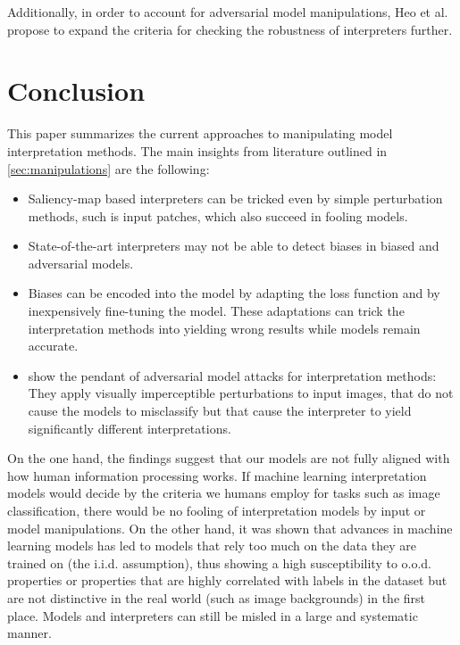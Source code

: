 \documentclass[sigconf]{acmart}
\begin{document}
Additionally, in order to account for adversarial model manipulations, Heo et al. \cite{fooling_nn_interpreters} propose to expand the criteria for checking the robustness of interpreters further.


% 
\section{Conclusion}
\label{sec:discussion}

This paper summarizes the current approaches to manipulating model interpretation methods. 
The main insights from literature outlined in \autoref{sec:manipulations} are the following: 
\begin{itemize}
    \item Saliency-map based interpreters can be tricked even by simple perturbation methods, such is input patches, which also succeed in fooling models. \cite{subramanya2019fooling}
    \item State-of-the-art interpreters may not be able to detect biases in biased and adversarial models.\cite{dimanov2020you, advlime_aies20}
    \item Biases can be encoded into the model by adapting the loss function and by inexpensively fine-tuning the model. These adaptations can trick the interpretation methods into yielding wrong results while models remain accurate. \cite{fooling_nn_interpreters}
    \item \cite{dombrowski2019explanations} show the pendant of adversarial model  attacks for interpretation methods: They apply visually imperceptible perturbations to input images, that do not cause the models to misclassify but that cause the interpreter to yield significantly different interpretations.
\end{itemize}
On the one hand, the findings suggest that our models are not fully aligned with how human information processing works. If machine learning interpretation models would decide by the criteria we humans employ for tasks such as image classification, there would be no fooling of interpretation models by input or model manipulations. 
On the other hand, it was shown that advances in machine learning models has led to models that rely too much on the data they are trained on (the i.i.d. assumption), thus showing a high susceptibility to o.o.d. properties or properties that are highly correlated with labels in the dataset but are not distinctive in the real world (such as image backgrounds) in the first place. Models and interpreters can still be misled in a large and systematic manner. 
\end{document}
